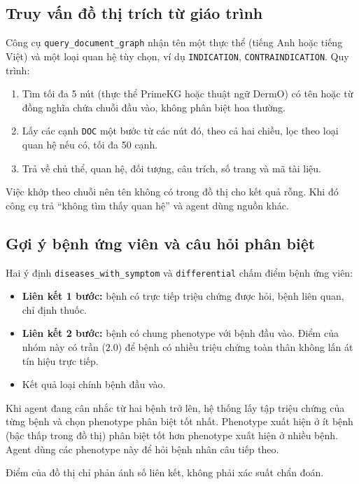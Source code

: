 \subsection{Truy vấn đồ thị trích từ giáo trình}

Công cụ \texttt{query\_document\_graph} nhận tên một thực thể (tiếng Anh hoặc tiếng Việt) và một loại quan hệ tùy chọn, ví dụ \texttt{INDICATION}, \texttt{CONTRAINDICATION}. Quy trình:
\begin{enumerate}
  \item Tìm tối đa 5 nút (thực thể PrimeKG hoặc thuật ngữ DermO) có tên hoặc từ đồng nghĩa chứa chuỗi đầu vào, không phân biệt hoa thường.
  \item Lấy các cạnh \texttt{DOC} một bước từ các nút đó, theo cả hai chiều, lọc theo loại quan hệ nếu có, tối đa 50 cạnh.
  \item Trả về chủ thể, quan hệ, đối tượng, câu trích, số trang và mã tài liệu.
\end{enumerate}

Việc khớp theo chuỗi nên tên không có trong đồ thị cho kết quả rỗng. Khi đó công cụ trả ``không tìm thấy quan hệ'' và agent dùng nguồn khác.

\subsection{Gợi ý bệnh ứng viên và câu hỏi phân biệt}
\label{sec:ung-vien}

Hai ý định \texttt{diseases\_with\_symptom} và \texttt{differential} chấm điểm bệnh ứng viên:
\begin{itemize}
  \item \textbf{Liên kết 1 bước:} bệnh có trực tiếp triệu chứng được hỏi, bệnh liên quan, chỉ định thuốc.
  \item \textbf{Liên kết 2 bước:} bệnh có chung phenotype với bệnh đầu vào. Điểm của nhóm này có trần ($2.0$) để bệnh có nhiều triệu chứng toàn thân không lấn át tín hiệu trực tiếp.
  \item Kết quả loại chính bệnh đầu vào.
\end{itemize}

Khi agent đang cân nhắc từ hai bệnh trở lên, hệ thống lấy tập triệu chứng của từng bệnh và chọn phenotype phân biệt tốt nhất. Phenotype xuất hiện ở ít bệnh (bậc thấp trong đồ thị) phân biệt tốt hơn phenotype xuất hiện ở nhiều bệnh. Agent dùng các phenotype này để hỏi bệnh nhân câu tiếp theo.

Điểm của đồ thị chỉ phản ánh số liên kết, không phải xác suất chẩn đoán.

